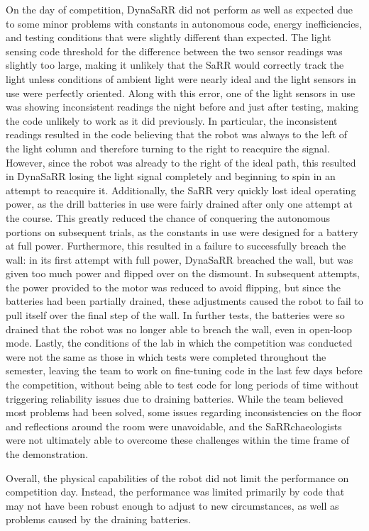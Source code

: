 On the day of competition, DynaSaRR did not perform as well as expected due to some minor problems with constants in autonomous code, energy inefficiencies, and testing conditions that were slightly different than expected. The light sensing code threshold for the difference between the two sensor readings was slightly too large, making it unlikely that the SaRR would correctly track the light unless conditions of ambient light were nearly ideal and the light sensors in use were perfectly oriented. Along with this error, one of the light sensors in use was showing inconsistent readings the night before and just after testing, making the code unlikely to work as it did previously. In particular, the inconsistent readings resulted in the code believing that the robot was always to the left of the light column and therefore turning to the right to reacquire the signal. However, since the robot was already to the right of the ideal path, this resulted in DynaSaRR losing the light signal completely and beginning to spin in an attempt to reacquire it. Additionally, the SaRR very quickly lost ideal operating power, as the drill batteries in use were fairly drained after only one attempt at the course. This greatly reduced the chance of conquering the autonomous portions on subsequent trials, as the constants in use were designed for a battery at full power. Furthermore, this resulted in a failure to successfully breach the wall: in its first attempt with full power, DynaSaRR breached the wall, but was given too much power and flipped over on the dismount. In subsequent attempts, the power provided to the motor was reduced to avoid flipping, but since the batteries had been partially drained, these adjustments caused the robot to fail to pull itself over the final step of the wall. In further tests, the batteries were so drained that the robot was no longer able to breach the wall, even in open-loop mode. Lastly, the conditions of the lab in which the competition was conducted were not the same as those in which tests were completed throughout the semester, leaving the team to work on fine-tuning code in the last few days before the competition, without being able to test code for long periods of time without triggering reliability issues due to draining batteries. While the team believed most problems had been solved, some issues regarding inconsistencies on the floor and reflections around the room were unavoidable, and the SaRRchaeologists were not ultimately able to overcome these challenges within the time frame of the demonstration.

Overall, the physical capabilities of the robot did not limit the performance on competition day. Instead, the performance was limited primarily by code that may not have been robust enough to adjust to new circumstances, as well as problems caused by the draining batteries. 

\newpage
 
